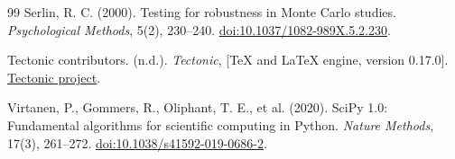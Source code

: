 \begin{thebibliography}{99}
Serlin, R. C. (2000). Testing for robustness in Monte Carlo studies.
\emph{Psychological Methods}, 5(2), 230--240.
\href{https://doi.org/10.1037/1082-989X.5.2.230}{doi:10.1037/1082-989X.5.2.230}.

Tectonic contributors. (n.d.).
\emph{Tectonic}, [TeX and LaTeX engine, version 0.17.0].
\href{https://github.com/tectonic-typesetting/tectonic}{Tectonic project}.

Virtanen, P., Gommers, R., Oliphant, T. E., et al. (2020). SciPy 1.0: Fundamental algorithms for scientific computing in Python.
\emph{Nature Methods}, 17(3), 261--272.
\href{https://doi.org/10.1038/s41592-019-0686-2}{doi:10.1038/s41592-019-0686-2}.

\end{thebibliography}

